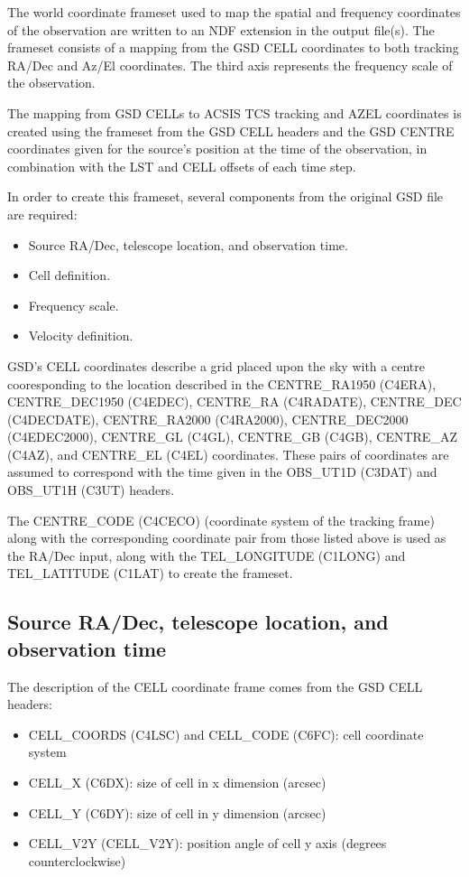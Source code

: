 \documentclass[twoside,11pt,nolof]{starlink}
\providecommand{\centreCode}{CENTRE\_CODE (C4CECO)}
\providecommand{\centreRARB}{CENTRE\_RA1950 (C4ERA)}
\providecommand{\centreDecRB}{CENTRE\_DEC1950 (C4EDEC)}
\providecommand{\centreRA}{CENTRE\_RA (C4RADATE)}
\providecommand{\centreDec}{CENTRE\_DEC (C4DECDATE)}
\providecommand{\centreRARJ}{CENTRE\_RA2000 (C4RA2000)}
\providecommand{\centreDecRJ}{CENTRE\_DEC2000 (C4EDEC2000)}
\providecommand{\centreGL}{CENTRE\_GL (C4GL)}
\providecommand{\centreGB}{CENTRE\_GB (C4GB)}
\providecommand{\centreAz}{CENTRE\_AZ (C4AZ)}
\providecommand{\centreEl}{CENTRE\_EL (C4EL)}
\providecommand{\cellCoords}{CELL\_COORDS (C4LSC)}
\providecommand{\cellCode}{CELL\_CODE (C6FC)}
\providecommand{\cellX}{CELL\_X (C6DX)}
\providecommand{\cellY}{CELL\_Y (C6DY)}
\providecommand{\cellVY}{CELL\_V2Y (CELL\_V2Y)}
\providecommand{\telLongitude}{TEL\_LONGITUDE (C1LONG)}
\providecommand{\telLatitude}{TEL\_LATITUDE (C1LAT)}
\providecommand{\obsUTd}{OBS\_UT1D (C3DAT)}
\providecommand{\obsUTh}{OBS\_UT1H (C3UT)}
\begin{document}
The world coordinate frameset used to map the spatial and frequency coordinates of the observation are written to an NDF extension in the output file(s).  The frameset consists of a mapping from the GSD CELL coordinates to both tracking RA/Dec and Az/El coordinates.  The third axis represents the frequency scale of the observation.

The mapping from GSD CELLs to ACSIS TCS tracking and AZEL coordinates is created using the frameset from the GSD CELL headers and the GSD CENTRE coordinates given for the source's position at the time of the observation, in combination with the LST and CELL offsets of each time step.

In order to create this frameset, several components from the original GSD file are required:

\begin{itemize}
\item Source RA/Dec, telescope location, and observation time.
\item Cell definition.
\item Frequency scale.
\item Velocity definition.
\end{itemize}

GSD's CELL coordinates describe a grid placed upon the sky with a centre cooresponding to the location described in the \centreRARB{}, \centreDecRB{}, \centreRA{}, \centreDec{}, \centreRARJ{}, \centreDecRJ{}, \centreGL{}, \centreGB{}, \centreAz{}, and \centreEl{} coordinates.  These pairs of coordinates are assumed to correspond with the time given in the \obsUTd{} and \obsUTh{} headers.

The \centreCode{} (coordinate system of the tracking frame) along with the corresponding coordinate pair from those listed above is used as the RA/Dec input, along with the \telLongitude{} and \telLatitude{} to create the frameset.

\subsection{Source RA/Dec, telescope location, and observation time}

The description of the CELL coordinate frame comes from the GSD CELL headers:

\begin{itemize}
\item \cellCoords{} and \cellCode{}: cell coordinate system
\item \cellX{}: size of cell in x dimension (arcsec)
\item \cellY{}: size of cell in y dimension (arcsec)
\item \cellVY{}: position angle of cell y axis (degrees counterclockwise)
\end{itemize}
\end{document}
